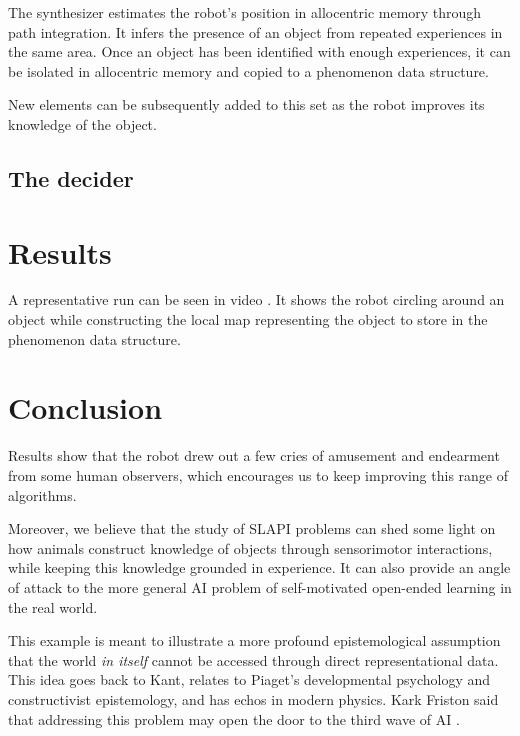 \documentclass[pmlr]{jmlr}%
\begin{document}
The synthesizer estimates the robot's position in allocentric memory through path integration. 
It infers the presence of an object from repeated experiences in the same area. 
Once an object has been identified with enough experiences, it can be isolated in allocentric memory and copied to a phenomenon data structure.

New elements can be subsequently added to this set as the robot improves its knowledge of the object. 

\subsection{The decider}
\label{sec:decider}


\section{Results}

A representative run can be seen in video \citep{titouan_knockaert_demonstration_2022}. 
It shows the robot circling around an object while constructing the local map representing the object to store in the phenomenon data structure.



\section{Conclusion}

Results show that the robot drew out a few cries of amusement and endearment from some human observers, which encourages us to keep improving this range of algorithms. 

Moreover, we believe that the study of SLAPI problems can shed some light on how animals construct knowledge of objects through sensorimotor interactions, while keeping this knowledge grounded in experience. 
It can also provide an angle of attack to the more general AI problem of self-motivated open-ended learning in the real world.

This example is meant to illustrate a more profound epistemological assumption that the world \textit{in itself} cannot be accessed through direct representational data. This idea goes back to Kant, relates to Piaget's developmental psychology and constructivist epistemology, and has echos in modern physics. 
Kark Friston said that addressing this problem may open the door to the third wave of AI \cite[time code 22:66]{videoFriston}. 





\end{document}
